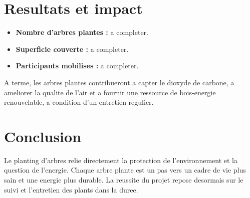 \documentclass[12pt,a4paper]{article}
\begin{document}
\section{Resultats et impact}
\begin{itemize}
  \item \textbf{Nombre d'arbres plantes :} a completer.
  \item \textbf{Superficie couverte :} a completer.
  \item \textbf{Participants mobilises :} a completer.
\end{itemize}

A terme, les arbres plantes contribueront a capter le dioxyde de carbone,
a ameliorer la qualite de l'air et a fournir une ressource de bois-energie
renouvelable, a condition d'un entretien regulier.

\section{Conclusion}
Le planting d'arbres relie directement la protection de l'environnement et la
question de l'energie. Chaque arbre plante est un pas vers un cadre de vie plus
sain et une energie plus durable. La reussite du projet repose desormais sur le
suivi et l'entretien des plants dans la duree.
\end{document}
